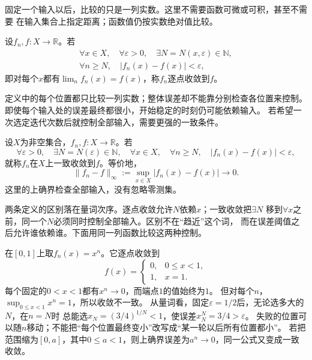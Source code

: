 固定一个输入以后，比较的只是一列实数。这里不需要函数可微或可积，甚至不需要
在输入集合上指定距离；函数值仍按实数绝对值比较。
\begin{definition}[逐点收敛]
\label{def:analysis-pointwise-almost-everywhere-convergence}
设$f_n,f:X\to\mathbb{R}$。若
\[
 \begin{gathered}
  \forall x\in X,\quad
  \forall\varepsilon>0,\quad
  \exists N=N(x,\varepsilon)\in\mathbb N,\\
  \forall n\geq N,\quad
  |f_n(x)-f(x)|<\varepsilon,
 \end{gathered}
\]
即对每个$x$都有$\lim_n f_n(x)=f(x)$，称$f_n$逐点收敛到$f$。
\end{definition}


定义中的每个位置都只比较一列实数；整体误差却不能靠分别检查各位置来控制。
即使每个输入处的误差最终都很小，开始稳定的时刻仍可能依赖输入。
若希望一次选定迭代次数后就控制全部输入，需要更强的一致条件。
\begin{definition}[函数列的一致收敛]
\label{def:analysis-uniform-convergence}
设$X$为非空集合，$f_n,f:X\to\mathbb R$。若
\[
  \forall\varepsilon>0,\quad
  \exists N=N(\varepsilon)\in\mathbb N,\quad
  \forall x\in X,\quad
  \forall n\geq N,\quad
  |f_n(x)-f(x)|<\varepsilon,
\]
就称$f_n$在$X$上一致收敛到$f$。等价地，
\begin{equation}
  \lVert f_n-f\rVert_{\infty}
  :=
  \sup_{x\in X}|f_n(x)-f(x)|
  \longrightarrow0.
\label{eq:analysis-uniform-convergence}
\end{equation}
这里的上确界检查全部输入，没有忽略零测集。
\end{definition}


两条定义的区别落在量词次序。逐点收敛允许$N$依赖$x$；一致收敛把$\exists N$
移到$\forall x$之前，同一个$N$必须同时控制全部输入。区别不在“趋近”这个词，
而在误差阈值之后允许谁依赖谁。下面用同一列函数比较这两种控制。

在$[0,1]$上取$f_n(x)=x^n$。它逐点收敛到
\[
 f(x)=
 \begin{cases}
  0,&0\leq x<1,\\
  1,&x=1.
 \end{cases}
\]
每个固定的$0<x<1$都有$x^n\to0$，而端点$1$的值始终为$1$。
但对每个$n$，$\sup_{0\leq x<1}x^n=1$，所以收敛不一致。
从量词看，固定$\varepsilon=1/2$后，无论选多大的$N$，在$n=N$时
总能选$x_N=(3/4)^{1/N}<1$，使误差$x_N^N=3/4>\varepsilon$。
失败的位置可以随$n$移动；不能把“每个位置最终变小”改写成“某一轮以后所有位置都小”。
若把范围缩为$[0,a]$，其中$0\leq a<1$，则上确界误差为$a^n\to0$，同一公式又变成一致收敛。

